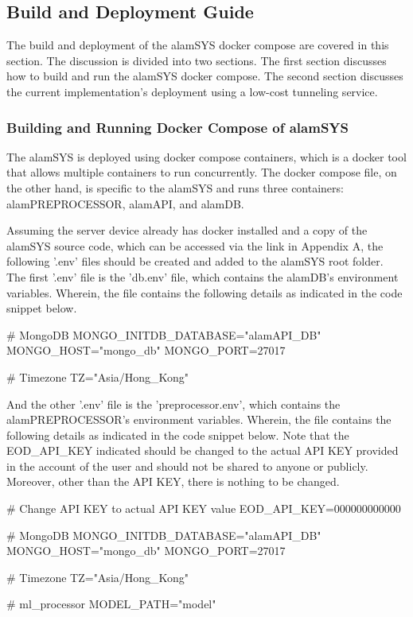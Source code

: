 \subsection{Build and Deployment Guide}
\label{subsec:build_deploy}
The build and deployment of the alamSYS docker compose are 
covered in this section. The discussion is divided into two sections. 
The first section discusses how to build and run the alamSYS docker compose. 
The second section discusses the current implementation's deployment using a 
low-cost tunneling service.

\subsubsection{Building and Running Docker Compose of alamSYS}
\label{subsubsec:docker_build}
The alamSYS is deployed using docker compose containers, 
which is a docker tool that allows multiple containers to run concurrently. 
The docker compose file, on the other hand, is specific to the alamSYS and 
runs three containers: alamPREPROCESSOR, alamAPI, and alamDB.


Assuming the server device already has docker installed and a copy of the alamSYS 
source code, which can be accessed via the link in Appendix A, the following '.env'
files should be created and added to the alamSYS root folder.
\\

The first '.env' file is the 'db.env' file, which contains the alamDB's 
environment variables. Wherein, the file contains the following details 
as indicated in the code snippet below.
\hfill \\
\begin{python}
    # MongoDB
    MONGO_INITDB_DATABASE="alamAPI_DB"
    MONGO_HOST="mongo_db"
    MONGO_PORT=27017

    # Timezone
    TZ="Asia/Hong_Kong"
\end{python}

And the other '.env' file is the 'preprocessor.env', which contains the 
alamPREPROCESSOR's environment variables. Wherein, the file contains the following 
details as indicated in the code snippet below. Note that the EOD\_API\_KEY
indicated should be changed to the actual API KEY provided in the account of 
the user and should not be shared to anyone or publicly. Moreover,
other than the API KEY, there is nothing to be changed.
\hfill \\
\begin{python}
    # Change API KEY to actual API KEY value
    EOD_API_KEY=000000000000

    # MongoDB
    MONGO_INITDB_DATABASE="alamAPI_DB"
    MONGO_HOST="mongo_db"
    MONGO_PORT=27017

    # Timezone
    TZ="Asia/Hong_Kong"

    # ml_processor
    MODEL_PATH="model"
\end{python}

